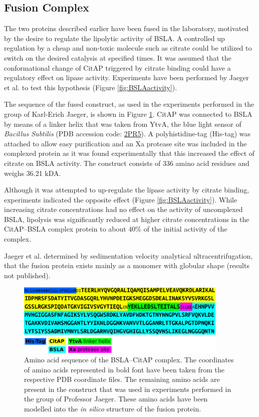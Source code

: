 \documentclass[english, a4paper, 12pt, titlepage, draft]{article}
\newcommand{\PDB}[1]{\href{http://pdb.rcsb.org/pdb/explore/explore.do?structureId=#1}{#1}}
\begin{document}

\subsection{Fusion Complex}

The two proteins described earlier have been fused in the laboratory, motivated by the desire to regulate the lipolytic activity of BSLA.
A controlled up regulation by a cheap and non-toxic molecule such as citrate could be utilized to switch on the desired catalysis at specified times.
It was assumed that the conformational change of CitAP triggered by citrate binding could have a regulatory effect on lipase activity.
Experiments have been performed by Jaeger et al. to test this hypothesis (Figure \ref{fig:BSLAactivity}).

The sequence of the fused construct, as used in the experiments performed in the group of Karl-Erich Jaeger, is shown in Figure \ref{fig:complex_sequence}.
CitAP was connected to BSLA by means of a linker helix that was taken from YtvA, the blue light sensor of \textit{Bacillus Subtilis} (PDB accession code: \PDB{2PR5}).
A polyhistidine-tag (His-tag) was attached to allow easy purification and
an Xa protease site was included in the complexed protein as it was found experimentally that this increased the effect of citrate on BSLA activity.
The construct consists of 336 amino acid residues and weighs 36.21 kDA.

Although it was attempted to up-regulate the lipase activity by citrate binding, experiments indicated the opposite effect (Figure \ref{fig:BSLAactivity}).
While increasing citrate concentrations had no effect on the activity of uncomplexed BSLA, lipolysis was significantly reduced at higher citrate concentrations in the CitAP--BSLA complex protein to about 40\% of the initial activity of the complex.

Jaeger et al. determined by sedimentation velocity analytical ultracentrifugation, that the fusion protein exists mainly as a monomer with globular shape (results not published).




\begin{figure}
    \centering
    \includegraphics[width=0.9\textwidth]{figures/Complex_sequence/Complex_sequence.pdf}
    \caption{Amino acid sequence of the BSLA--CitAP complex. The coordinates of amino acids represented in bold font have been taken from the respective PDB coordinate files.
    The remaining amino acids are present in the construct that was used in experiments performed in the group of Professor Jaeger. These amino acids have been modelled into the \emph{in silico} structure of the fusion protein.}
    \label{fig:complex_sequence}
\end{figure}       
\end{document}
